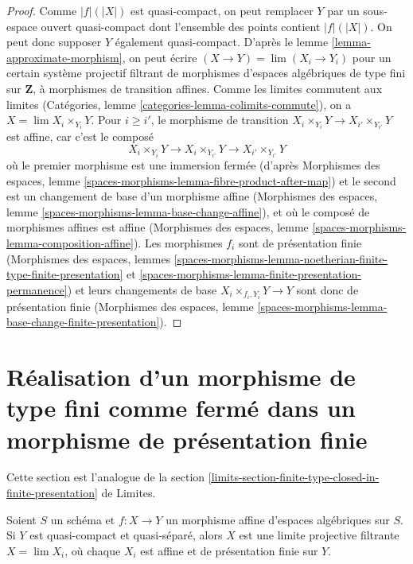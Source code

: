 \begin{proof}
Comme $|f|(|X|)$ est quasi-compact, on peut remplacer $Y$ par un sous-espace
ouvert quasi-compact dont l'ensemble des points contient $|f|(|X|)$. On peut donc supposer
$Y$ également quasi-compact.
D'après le lemme \ref{lemma-approximate-morphism}, on peut écrire
$(X \to Y) = \lim (X_i \to Y_i)$ pour un certain système projectif filtrant
de morphismes d'espaces algébriques de type fini sur $\mathbf{Z}$, à
morphismes de transition affines. Comme les limites commutent aux limites
(Catégories, lemme \ref{categories-lemma-colimits-commute}),
on a $X = \lim X_i \times_{Y_i} Y$. Pour $i \geq i'$,
le morphisme de transition
$X_i \times_{Y_i} Y \to X_{i'} \times_{Y_{i'}} Y$ est affine, car c'est
le composé
$$
X_i \times_{Y_i} Y \to X_i \times_{Y_{i'}} Y \to X_{i'} \times_{Y_{i'}} Y
$$
où le premier morphisme est une immersion fermée (d'après
Morphismes des espaces, lemme
\ref{spaces-morphisms-lemma-fibre-product-after-map})
et le second est un changement de base d'un morphisme affine
(Morphismes des espaces, lemme \ref{spaces-morphisms-lemma-base-change-affine}),
et où le composé de morphismes affines est affine
(Morphismes des espaces, lemme \ref{spaces-morphisms-lemma-composition-affine}).
Les morphismes $f_i$ sont de présentation finie
(Morphismes des espaces, lemmes
\ref{spaces-morphisms-lemma-noetherian-finite-type-finite-presentation} et
\ref{spaces-morphisms-lemma-finite-presentation-permanence})
et leurs changements de base $X_i \times_{f_i, Y_i} Y \to Y$
sont donc de présentation finie
(Morphismes des espaces, lemme
\ref{spaces-morphisms-lemma-base-change-finite-presentation}).
\end{proof}






\section{Réalisation d'un morphisme de type fini comme fermé dans un morphisme de présentation finie}
\label{section-finite-type-closed-in-finite-presentation}

\noindent
Cette section est l'analogue de la
section \ref{limits-section-finite-type-closed-in-finite-presentation} de Limites.

\begin{lemma}
\label{lemma-affine-morphism-is-limit}
Soient $S$ un schéma et $f : X \to Y$ un morphisme affine d'espaces
algébriques sur $S$. Si $Y$ est quasi-compact et
quasi-séparé, alors $X$ est une limite projective filtrante $X = \lim X_i$,
où chaque $X_i$ est affine et de présentation finie sur $Y$.
\end{lemma}


